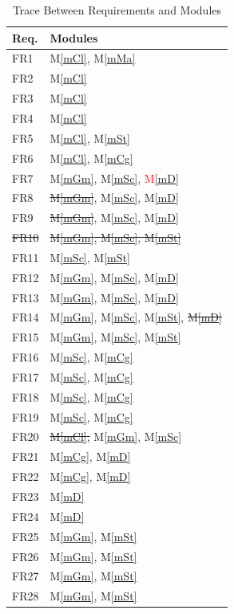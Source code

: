 \documentclass[12pt, titlepage]{article}
\newcommand{\mref}[1]{M\ref{#1}}
\begin{document}
\begin{table}[!htbp]
\centering
\begin{tabular}{p{} p{}}
\toprule
\textbf{Req.} & \textbf{Modules}\\
\midrule
FR1 & \mref{mCl}, \mref{mMa}\\
FR2 & \mref{mCl}\\
FR3 & \mref{mCl}\\
FR4 & \mref{mCl}\\
FR5 & \mref{mCl}, \mref{mSt}\\
FR6 & \mref{mCl}, \mref{mCg}\\
FR7 & \mref{mGm}, \mref{mSc}, \textcolor{red}{\mref{mD}}\\
FR8 & \sout{\mref{mGm}}, \mref{mSc}, \mref{mD}\\
FR9 & \sout{\mref{mGm}}, \mref{mSc}, \mref{mD}\\
\sout{FR10} & \sout{\mref{mGm}, \mref{mSc}, \mref{mSt}}\\
FR11 & \mref{mSc}, \mref{mSt}\\
FR12 & \mref{mGm}, \mref{mSc}, \mref{mD}\\
FR13 & \mref{mGm}, \mref{mSc}, \mref{mD}\\
FR14 & \mref{mGm}, \mref{mSc}, \mref{mSt}, \sout{\mref{mD}}\\
FR15 & \mref{mGm}, \mref{mSc}, \mref{mSt}\\
FR16 & \mref{mSc}, \mref{mCg}\\
FR17 & \mref{mSc}, \mref{mCg}\\
FR18 & \mref{mSc}, \mref{mCg}\\
FR19 & \mref{mSc}, \mref{mCg}\\
FR20 & \sout{\mref{mCl},} \mref{mGm}, \mref{mSc}\\
FR21 & \mref{mCg}, \mref{mD}\\
FR22 & \mref{mCg}, \mref{mD}\\
FR23 & \mref{mD}\\
FR24 & \mref{mD}\\
FR25 & \mref{mGm}, \mref{mSt}\\
FR26 & \mref{mGm}, \mref{mSt}\\
FR27 & \mref{mGm}, \mref{mSt}\\
FR28 & \mref{mGm}, \mref{mSt}\\
\bottomrule
\end{tabular}
\caption{Trace Between Requirements and Modules}
\label{TblRT}
\end{table}
\end{document}
